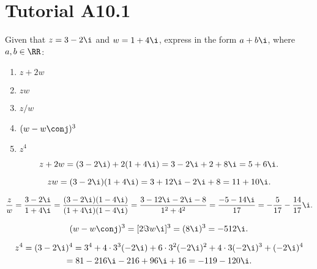 \section{Tutorial A10.1}

\begin{problem}
    Given that $z = 3 - 2\i$ and $w = 1 + 4\i$, express in the form $a + b\i$, where $a, b \in \RR$:
    \begin{enumerate}
        \item $z + 2w$
        \item $zw$
        \item $z/w$
        \item $(w-w\conj)^3$
        \item $z^4$
    \end{enumerate}
\end{problem}
\begin{solution}
    \begin{ppart}
        \[z + 2w = (3-2\i) + 2(1 + 4\i) = 3 - 2\i + 2 + 8\i = 5 + 6\i.\]
    \end{ppart}
    \begin{ppart}
        \[zw = (3-2\i)(1+4\i) = 3 + 12\i - 2\i + 8 = 11 + 10\i.\]
    \end{ppart}
    \begin{ppart}
        \[\frac{z}{w} = \frac{3-2\i}{1+4\i} = \frac{(3-2\i)(1-4\i)}{(1+4\i)(1-4\i)} = \frac{3 - 12\i - 2\i - 8}{1^2 + 4^2} = \frac{-5 - 14\i}{17} = -\frac5{17} - \frac{14}{17}\i.\]
    \end{ppart}
    \begin{ppart}
        \[(w - w\conj)^3 = [2 \Im{w} \i]^3 = (8\i)^3 = -512\i.\]
    \end{ppart}
    \begin{ppart}
        \begin{gather*}
            z^4 = (3-2\i)^4 = 3^4 + 4 \cdot 3^3 (-2\i) + 6 \cdot 3^2 (-2\i)^2 + 4 \cdot 3 (-2\i)^3 + (-2\i)^4\\
            = 81 - 216\i - 216 + 96\i + 16 = -119 - 120\i.
        \end{gather*}
    \end{ppart}
\end{solution}

